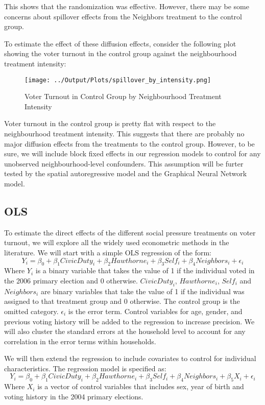\documentclass[11pt]{article}
\begin{document}
This shows that the randomization was effective. However, there may be some concerns about spillover effects from the Neighbors treatment to the control group. 

To estimate the effect of these diffusion effects, consider the following plot showing the voter turnout in the control group against the neighbourhood treatment intensity:
\begin{figure}[H]
    \centering
    \texttt{[image: ../Output/Plots/spillover\_by\_intensity.png]}   
    \caption{Voter Turnout in Control Group by Neighbourhood Treatment Intensity}
    \label{fig:figure2}
\end{figure}

Voter turnout in the control group is pretty flat with respect to the neighbourhood treatment intensity. This suggests that there are probably no major diffusion effects from the treatments to the control group. However, to be sure, we will include block fixed effects in our regression models to control for any unobserved neighbourhood-level confounders. This assumption will be furter tested by the spatial autoregressive model and the Graphical Neural Network model.

\subsection{OLS}
To estimate the direct effects of the different social pressure treatments on voter turnout, we will explore all the widely used econometric methods in the literature. We will start with a simple OLS regression of the form:
\begin{equation}
    Y_i = \beta_0 + \beta_1 CivicDuty_i + \beta_2 Hawthorne_i + \beta_3 Self_i + \beta_4 Neighbors_i + \epsilon_i
\end{equation}
Where $Y_i$ is a binary variable that takes the value of 1 if the individual voted in the 2006 primary election and 0 otherwise. $CivicDuty_i$, $Hawthorne_i$, $Self_i$ and $Neighbors_i$ are binary variables that take the value of 1 if the individual was assigned to that treatment group and 0 otherwise. The control group is the omitted category. $\epsilon_i$ is the error term.
Control variables for age, gender, and previous voting history will be added to the regression to increase precision. We will also cluster the standard errors at the household level to account for any correlation in the error terms within households.

We will then extend the regression to include covariates to control for individual characteristics. The regression model is specified as:
\begin{equation}
    Y_i = \beta_0 + \beta_1 CivicDuty_i + \beta_2 Hawthorne_i + \beta_3 Self_i + \beta_4 Neighbors_i + \beta_5 X_i + \epsilon_i
\end{equation}
Where $X_i$ is a vector of control variables that includes sex, year of birth and voting history in the 2004 primary elections.
\end{document}
